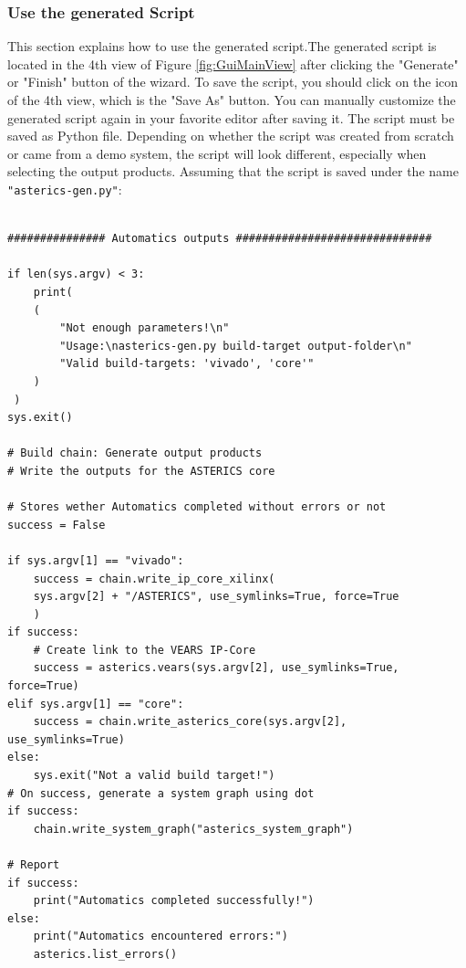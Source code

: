 	\subsubsection{Use the generated Script}\label{subsub:06-05-generated-script}
	This section explains how to use the generated script.The generated script is located in the 4th view of Figure \ref{fig:GuiMainView} after clicking the "Generate" or "Finish" button of the wizard.  
	To save the script, you should click on the icon of the 4th view, which is the "Save As" button. You can manually customize the generated script again in your favorite editor after saving it. The script must be saved as Python file. Depending on whether the script was created from scratch or came from a demo system, the script will look different, especially when selecting the output products. Assuming that the script is saved under the name \texttt{"asterics-gen.py"}:
\begin{lstlisting}[style=AutomaticsPython, label=Code:06-05-demo-output-product, caption=Script: Demo system output product]

############### Automatics outputs ##############################

if len(sys.argv) < 3:
	print(
	(
		"Not enough parameters!\n"
		"Usage:\nasterics-gen.py build-target output-folder\n"
		"Valid build-targets: 'vivado', 'core'"
	)
 )
sys.exit()

# Build chain: Generate output products
# Write the outputs for the ASTERICS core

# Stores wether Automatics completed without errors or not
success = False

if sys.argv[1] == "vivado":
	success = chain.write_ip_core_xilinx(
	sys.argv[2] + "/ASTERICS", use_symlinks=True, force=True
	)
if success:
	# Create link to the VEARS IP-Core
	success = asterics.vears(sys.argv[2], use_symlinks=True, force=True)
elif sys.argv[1] == "core":
	success = chain.write_asterics_core(sys.argv[2], use_symlinks=True)
else:
	sys.exit("Not a valid build target!")
# On success, generate a system graph using dot
if success:
	chain.write_system_graph("asterics_system_graph")

# Report
if success:
	print("Automatics completed successfully!")
else:
	print("Automatics encountered errors:")
	asterics.list_errors()
\end{lstlisting}
